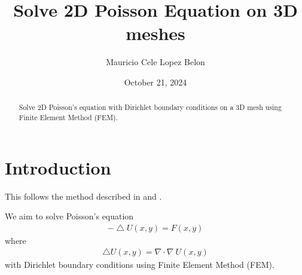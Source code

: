 \documentclass{birkjour}
\numberwithin{equation}{section}
\begin{document}
%
%
%
%
%
%
%
%
%


\title[Solve 2D Poisson Equation on 3D meshes]
 {Solve 2D Poisson Equation on 3D meshes}

\author[Mauricio Cele Lopez Belon]{Mauricio Cele Lopez Belon}
\address{Madrid, Spain}



\date{October 21, 2024}

\begin{abstract}

Solve 2D Poisson's equation with Dirichlet boundary conditions on a 3D mesh using Finite Element Method (FEM).

\end{abstract}

\maketitle
\section{Introduction}


This follows the method described in \cite{Sayas2015} and \cite{Langtangen2014}.

We aim to solve Poisson's equation 
\begin{eqnarray}
	- \bigtriangleup U(x, y) = F(x, y)
\end{eqnarray}
where 
\begin{eqnarray}
	\bigtriangleup U(x,y) = \nabla \cdot \nabla \ U(x,y)
\end{eqnarray}
with Dirichlet boundary conditions using Finite Element Method (FEM).
\end{document}
